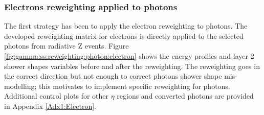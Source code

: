 \subsubsection{Electrons reweighting applied to photons}
The first strategy has been to apply the electron reweighting to photons. The developed reweighting matrix for electrons is directly applied to the selected photons from radiative Z events. Figure \ref{fig:gamma:ss:reweighting:photon:electron} shows the energy profiles and layer 2 shower shapes variables before and after the reweighting. The reweighting goes in the correct direction but not enough to correct photons shower shape mis-modelling; this motivates to implement specific reweighting for photons. Additional control plots for other $\eta$ regions and converted photons are provided in Appendix \ref{Adx1:Electron}.
\begin{figure}[htbp]
    \centering
	 \\

\end{figure}
